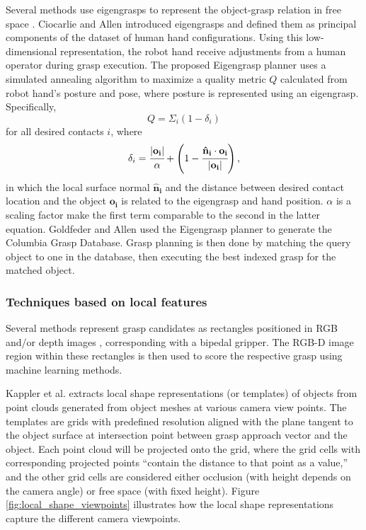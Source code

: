 Several methods use eigengrasps to represent the object-grasp relation in free space \cite{Goldfeder2011,Ciocarlie2009}.
Ciocarlie and Allen \cite{Ciocarlie2009} introduced eigengrasps and defined them as principal components of the dataset
of human hand configurations. Using this low-dimensional representation, the robot hand receive adjustments from a human
operator during grasp execution. The proposed Eigengrasp planner uses a simulated annealing algorithm to maximize a
quality metric $Q$ calculated from robot hand's posture and pose, where posture is represented using an eigengrasp.
Specifically,
\[ Q = \Sigma_i (1 - \delta_i) \]
for all desired contacts $i$, where
\[ \delta_i = \cfrac{|\mathbf{o_i}|}{\alpha}
              + \left(1 - \cfrac{\mathbf{\hat{n}_i} \cdot \mathbf{o_i}}{|\mathbf{o_i}|} \right), \]
in which the local surface normal $\mathbf{\hat{n}_i}$ and the distance between desired contact location and the
object $\mathbf{o_i}$ is related to the eigengrasp and hand position. $\alpha$ is a scaling factor make the first term
comparable to the second in the latter equation. Goldfeder and Allen \cite{Goldfeder2011} used the Eigengrasp planner
to generate the Columbia Grasp Database. Grasp planning is then done by matching the query object to one in the
database, then executing the best indexed grasp for the matched object.


\subsubsection*{Techniques based on local features} \label{subsub:object_grasp_local}

Several methods represent grasp candidates as rectangles positioned in RGB and/or depth images \cite{lenz2015,jiang2011},
corresponding with a bipedal gripper. The RGB-D image region within these rectangles is then used to score the
respective grasp using machine learning methods.

Kappler et al. \cite{Kappler2015} extracts local shape representations (or templates) of objects from point clouds
generated from object meshes at various camera view points. The templates are grids with predefined resolution
aligned with the plane tangent to the object surface at intersection point between grasp approach vector and the
object. Each point cloud will be projected onto the grid, where the grid cells with corresponding projected points
``contain the distance to that point as a value,'' and the other grid cells are considered either occlusion
(with height depends on the camera angle) or free space (with fixed height). Figure \ref{fig:local_shape_viewpoints}
illustrates how the local shape representations capture the different camera viewpoints.

